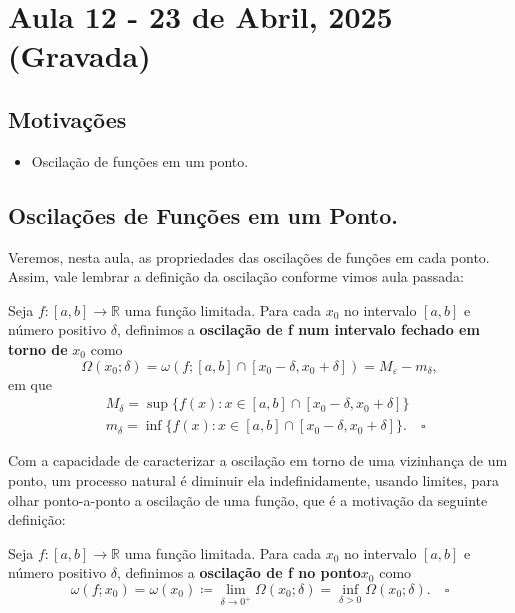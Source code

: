 \documentclass[../analysisII_notes.tex]{subfiles}
\begin{document}
\section{Aula 12 - 23 de Abril, 2025 (Gravada)}
\subsection{Motivações}
\begin{itemize}
	\item Oscilação de funções em um ponto.
\end{itemize}
\subsection{Oscilações de Funções em um Ponto.}
Veremos, nesta aula, as propriedades das oscilações de funções em cada ponto. Assim, vale lembrar a definição da oscilação conforme vimos aula passada:
\begin{def*}
	Seja \(f:[a, b]\rightarrow \mathbb{R}\) uma função limitada. Para cada \(x_{0}\) no intervalo \([a, b]\) e número positivo \(\delta \), definimos a \textbf{oscilação de f num intervalo fechado em torno de }\(x_{0}\) como
	\[
		\Omega (x_{0}; \delta )=\omega(f; [a, b]\cap [x_{0}-\delta , x_{0}+\delta ]) = M_{\varepsilon }-m_{\delta },
	\]
	em que
	\begin{align*}
		 & M_{\delta }=\sup_{}\{f(x):x\in [a, b]\cap [x_{0}-\delta , x_{0}+\delta ]\}               \\
		 & m_{\delta }=\inf_{}\{f(x):x\in [a, b]\cap [x_{0}-\delta , x_{0}+\delta ]\}.\quad \square
	\end{align*}
\end{def*}
Com a capacidade de caracterizar a oscilação em torno de uma vizinhança de um ponto, um processo natural é diminuir ela indefinidamente, usando limites, para olhar ponto-a-ponto a oscilação de uma função, que é a motivação da seguinte definição:

\begin{def*}
	Seja \(f:[a, b]\rightarrow \mathbb{R}\) uma função limitada. Para cada \(x_{0}\) no intervalo \([a, b]\) e número positivo \(\delta \), definimos a \textbf{oscilação de f no ponto}\(x_{0}\) como
	\[
		\omega (f; x_{0})=\omega (x_{0})\coloneqq \lim_{\delta \to 0^{+}}\Omega (x_{0}; \delta )=\inf_{\delta > 0}\Omega (x_{0};\delta ). \quad \square
	\]
\end{def*}
\end{document}
